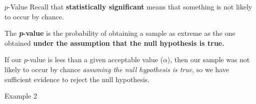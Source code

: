 \documentclass[t]{beamer}
\begin{document}
\begin{frame}{$p$-Value}
Recall that {\color{blue}\textbf{statistically significant}} means that something is not likely to occur by chance. \newline\\	\pause

\begin{tcolorbox}[colframe=green!20!black, colback = green!30!white,title=\textbf{\textit{p}-Value}]
The \textbf{\textit{p}-value} is the probability of obtaining a sample as extreme as the one obtained \textbf{under the assumption that the null hypothesis is true.}
\end{tcolorbox}
\bigskip \pause

If our $p$-value is less than a given acceptable value ($\alpha$), then our sample was not likely to occur by chance \emph{assuming the null hypothesis is true}, \pause so we have sufficient evidence to reject the null hypothesis.
\end{frame}

\begin{frame}{Example 2}

\end{frame}

\end{document}
